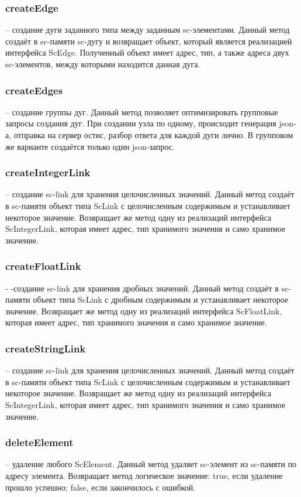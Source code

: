 \subsubsection {createEdge} -- создание дуги заданного типа между заданным sc-элементами. Данный метод создаёт в sc-памяти sc-дугу и возвращает объект, который является реализацией интерфейса ScEdge. Полученный объект имеет адрес, тип, а также адреса двух sc-элементов, между которыми находится данная дуга.
\subsubsection {createEdges} -- создание группы дуг. Данный метод позволяет оптимизировать групповые запросы создания дуг. При создании узла по одному, происходит генерация json-а, отправка на сервер остис, разбор ответа для каждой дуги лично. В групповом же варианте создаётся только один json-запрос. 
\subsubsection {createIntegerLink} -- создание sc-link для хранения целочисленных значений. Данный метод создаёт в sc-памяти объект типа ScLink с целочисленным содержимым и устанавливает некоторое значение. Возвращает же метод одну из реализаций интерфейса {ScIntegerLink}, которая имеет адрес, тип хранимого значения и само хранимое значение. 
\subsubsection {createFloatLink} - -создание sc-link для хранения дробных значений. Данный метод создаёт в sc-памяти объект типа ScLink с дробным содержимым и устанавливает некоторое значение. Возвращает же метод одну из реализаций интерфейса ScFloatLink, которая имеет адрес, тип хранимого значения и само хранимое значение. 
\subsubsection {createStringLink} -- создание sc-link для хранения целочисленных значений. Данный метод создаёт в sc-памяти объект типа ScLink с целочисленным содержимым и устанавливает некоторое значение. Возвращает же метод одну из реализаций интерфейса ScIntegerLink, которая имеет адрес, тип хранимого значения и само хранимое значение. 
\subsubsection {deleteElement} -- удаление любого ScElement. Данный метод удаляет sc-элемент из sc-памяти по адресу элемента. Возвращает метод логическое значение: true, если удаление прошло успешно; false, если закончилось с ошибкой. 
